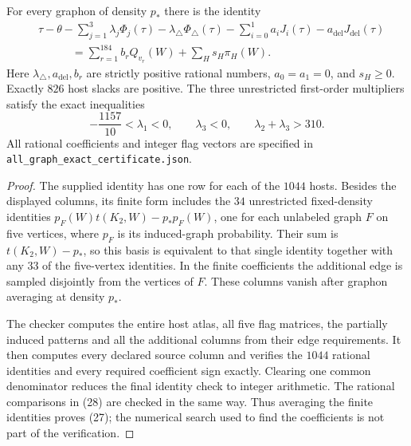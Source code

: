 \begin{proposition}\label{prop:finite-certificate}
For every graphon of density \(p_*\) there is the identity
\begin{equation}
 \begin{aligned}
 &\tau-\theta-\sum_{j=1}^3\lambda_j\Phi_j(\tau)
       -\lambda_\triangle\Phi_\triangle(\tau)
       -\sum_{i=0}^1a_iJ_i(\tau)-a_{\mathrm{del}}J_{\mathrm{del}}(\tau)\\
 &\hspace{3em}
       =\sum_{r=1}^{184}b_rQ_{v_r}(W)+\sum_Hs_H\pi_H(W).
 \end{aligned}\tag{27}
\end{equation}
Here \(\lambda_\triangle,a_{\mathrm{del}},b_r\) are strictly positive
rational numbers, \(a_0=a_1=0\), and \(s_H\ge0\). Exactly \(826\) host
slacks are positive. The three unrestricted first-order multipliers
satisfy the exact inequalities
\begin{equation}
 -\frac{1157}{10}<\lambda_1<0,\qquad
 \lambda_3<0,\qquad\lambda_2+\lambda_3>310.\tag{28}
\end{equation}
All rational coefficients and integer flag vectors are specified in
\texttt{\upshape all\_\allowbreak graph\_\allowbreak exact\_\allowbreak certificate.json}.
\end{proposition}
\begin{proof}
The supplied identity has one row for each of the \(1044\) hosts.
Besides the displayed columns, its finite form includes the \(34\)
unrestricted fixed-density identities
\(p_F(W)t(K_2,W)-p_*p_F(W)\), one for each unlabeled graph \(F\) on
five vertices, where \(p_F\) is its induced-graph probability.
Their sum is \(t(K_2,W)-p_*\), so this basis is equivalent to that
single identity together with any \(33\) of the five-vertex identities.
In the finite coefficients the additional edge is sampled disjointly
from the vertices of \(F\). These columns vanish after graphon averaging
at density \(p_*\).

The checker computes the entire host atlas, all five flag matrices,
the partially induced patterns and all the additional columns from their
edge requirements. It then computes every declared source column and
verifies the \(1044\) rational identities and every required coefficient
sign exactly. Clearing one
common denominator reduces the final identity check to integer arithmetic.
The rational comparisons in (28) are checked in the same way. Thus
averaging the finite identities proves (27); the numerical search used
to find the coefficients is not part of the verification.
\end{proof}

